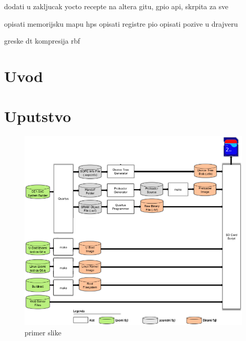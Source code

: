 \documentclass[12pt, a4paper]{article}
\begin{document}



dodati 
u zakljucak yocto recepte na altera gitu, gpio api, skrpita za sve

opisati memorijsku mapu hps
opisati registre pio
opisati pozive u drajveru

greske 
dt
kompresija rbf
\section{Uvod}


\pagebreak
\section{Uputstvo}




\begin{figure}[h!]
\centering
\includegraphics[scale=1.]{img/gsrd-flow.png}
\caption{primer slike}
\label{slika1:hw}
\end{figure}
\end{document}
